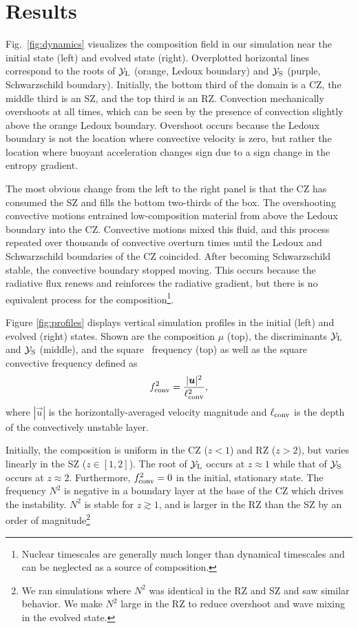 \section{Results}
\label{sec:results}

Fig.~\ref{fig:dynamics} visualizes the composition field in our simulation near the initial state (left) and evolved state (right).
Overplotted horizontal lines correspond to the roots of $\mathcal{Y}_{\rm{L}}$ (orange, Ledoux boundary) and $\mathcal{Y}_{\rm{S}}$ (purple, Schwarzschild boundary).
Initially, the bottom third of the domain is a CZ, the middle third is an SZ, and the top third is an RZ.
Convection mechanically overshoots at all times, which can be seen by the presence of convection slightly above the orange Ledoux boundary.
Overshoot occurs because the Ledoux boundary is not the location where convective velocity is zero, but rather the location where buoyant acceleration changes sign due to a sign change in the entropy gradient.

The most obvious change from the left to the right panel is that the CZ has consumed the SZ and fills the bottom two-thirds of the box.
The overshooting convective motions entrained low-composition material from above the Ledoux boundary into the CZ.
Convective motions mixed this fluid, and this process repeated over thousands of convective overturn times until the Ledoux and Schwarzschild boundaries of the CZ coincided.
After becoming Schwarzschild stable, the convective boundary stopped moving.
This occurs because the radiative flux renews and reinforces the radiative gradient, but there is no equivalent process for the composition\footnote{Nuclear timescales are generally much longer than dynamical timescales and can be neglected as a source of composition.}.

Figure \ref{fig:profiles} displays vertical simulation profiles in the initial (left) and evolved (right) states.
Shown are the composition $\mu$ (top), the discriminants $\mathcal{Y}_{\rm{L}}$ and $\mathcal{Y}_{\rm{S}}$ (middle), and the square \brunt$\,$ frequency (top) as well as the square convective frequency defined as
\begin{equation}
f_{\rm{conv}}^2 = \frac{|\vec{u}|^2}{\ell_{\rm{conv}}^2},
\label{eqn:fconv2}
\end{equation}
where $|\vec{u}|$ is the horizontally-averaged velocity magnitude and $\ell_{\rm{conv}}$ is the depth of the convectively unstable layer.

Initially, the composition is uniform in the CZ ($z < 1$) and RZ ($z > 2$), but varies linearly in the SZ ($z \in [1, 2]$).
The root of $\mathcal{Y}_{\rm{L}}$ occurs at $z \approx 1$ while that of $\mathcal{Y}_{\rm{S}}$ occurs at $z \approx 2$.
Furthermore, $f_{\rm{conv}}^2 = 0$ in the initial, stationary state.
The \brunt$\,$ frequency $N^2$ is negative in a boundary layer at the base of the CZ which drives the instability.
$N^2$ is stable for $z \gtrsim 1$, and is larger in the RZ than the SZ by an order of magnitude\footnote{We ran simulations where $N^2$ was identical in the RZ and SZ and saw similar behavior.
We make $N^2$ large in the RZ to reduce overshoot and wave mixing in the evolved state.}

